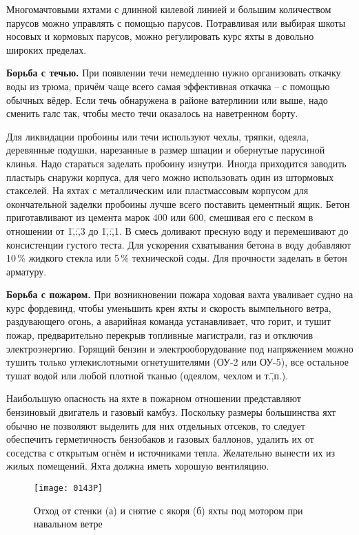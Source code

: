Многомачтовыми яхтами с длинной килевой линией и большим количеством
парусов можно управлять с помощью парусов. Потравливая или выбирая
шкоты носовых и кормовых парусов, можно регулировать курс яхты в
довольно широких пределах.

\textbf{Борьба с течью.} При появлении течи немедленно нужно
организовать откачку воды из трюма, причём чаще всего самая
эффективная откачка \--- с помощью обычных вёдер. Если течь обнаружена
в районе ватерлинии или выше, надо сменить галс так, чтобы место течи
оказалось на наветренном борту.

Для ликвидации пробоины или течи используют чехлы, тряпки, одеяла,
деревянные подушки, нарезанные в размер шпации и обернутые парусиной
клинья. Надо стараться заделать пробоину изнутри. Иногда приходится
заводить пластырь снаружи корпуса, для чего можно использовать один из
штормовых стакселей. На яхтах с металлическим или пластмассовым
корпусом для окончательной заделки пробоины лучше всего поставить
цементный ящик. Бетон приготавливают из цемента марок 400 или 600,
смешивая его с песком в отношении от 1\=,:\=,3 до 1\=,:\=,1. В смесь
доливают пресную воду и перемешивают до консистенции густого
теста. Для ускорения схватывания бетона в воду добавляют 10\,\%
жидкого стекла или 5\,\% технической соды. Для прочности заделать в
бетон арматуру.

\textbf{Борьба с пожаром.} При возникновении пожара ходовая вахта
уваливает судно на курс фордевинд, чтобы уменьшить крен яхты и
скорость вымпельного ветра, раздувающего огонь, а аварийная команда
устанавливает, что горит, и тушит пожар, предварительно перекрыв
топливные магистрали, газ и отключив электроэнергию. Горящий бензин и
электрооборудование под напряжением можно тушить только углекислотными
огнетушителями (ОУ-2 или ОУ-5), все остальное тушат водой или любой
плотной тканью (одеялом, чехлом и т.\=,п.).

Наибольшую опасность на яхте в пожарном отношении представляют
бензиновый двигатель и газовый камбуз. Поскольку размеры большинства
яхт обычно не позволяют выделить для них отдельных отсеков, то следует
обеспечить герметичность бензобаков и газовых баллонов, удалить их от
соседства с открытым огнём и источниками тепла. Желательно вынести их
из жилых помещений. Яхта должна иметь хорошую вентиляцию.

\begin{figure*}[!htb]
  \centering{}
  \texttt{[image: 0143P]}
  \caption{Отход от стенки (а) и снятие с якоря (б) яхты под мотором при навальном ветре}
  \label{fig:143}
\end{figure*}

